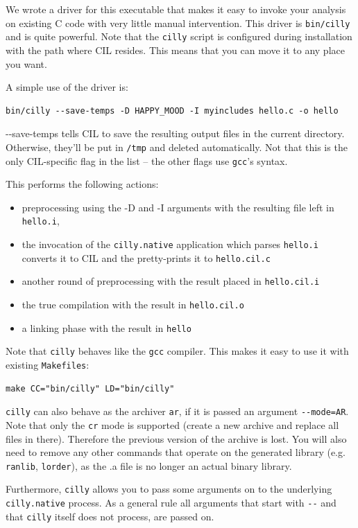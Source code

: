 \documentclass[letterpaper]{article}
\def\t#1{{\tt #1}}
\newcommand\codecolor{\ifhevea\blue\else\fi}
\renewcommand\c[1]{{\codecolor #1}} %
\begin{document}
 We wrote a driver for this executable that makes it easy to invoke your
analysis on existing C code with very little manual intervention. This driver
is \t{bin/cilly} and is quite powerful. Note that the \t{cilly} script
is configured during installation with the path where CIL resides. This means
that you can move it to any place you want.

 A simple use of the driver is:
\begin{verbatim}
bin/cilly --save-temps -D HAPPY_MOOD -I myincludes hello.c -o hello
\end{verbatim}

\c{-{}-save-temps} tells CIL to save the resulting output files in the
current directory.  Otherwise, they'll be put in \t{/tmp} and deleted
automatically.  Not that this is the only CIL-specific flag in the
list -- the other flags use \t{gcc}'s syntax.

This performs the following actions:
\begin{itemize}
\item preprocessing using the -D and -I arguments with the resulting
  file left in \t{hello.i},
\item the invocation of the \t{cilly.native} application which parses \t{hello.i}
  converts it to CIL and the pretty-prints it to \t{hello.cil.c}
\item another round of preprocessing with the result placed in \t{hello.cil.i}
\item the true compilation with the result in \t{hello.cil.o}
\item a linking phase with the result in \t{hello}
\end{itemize}

 Note that \t{cilly} behaves like the \t{gcc} compiler. This makes it
easy to use it with existing \t{Makefiles}:
\begin{verbatim}
make CC="bin/cilly" LD="bin/cilly"
\end{verbatim}

 \t{cilly} can also behave as the archiver \t{ar}, if it is passed an
 argument \t{-{}-mode=AR}. Note that only the \t{cr} mode is supported
 (create a new archive and replace all files in there).  Therefore the
 previous version of the archive is lost. You will also need to remove
 any other commands that operate on the generated library
 (e.g. \t{ranlib}, \t{lorder}), as the .a file is no longer an actual
 binary library.

 Furthermore, \t{cilly} allows you to pass some arguments on to the
underlying \t{cilly.native} process. As a general rule all arguments that start
with \t{-{}-} and that \t{cilly} itself does not process, are passed on.
\end{document}

